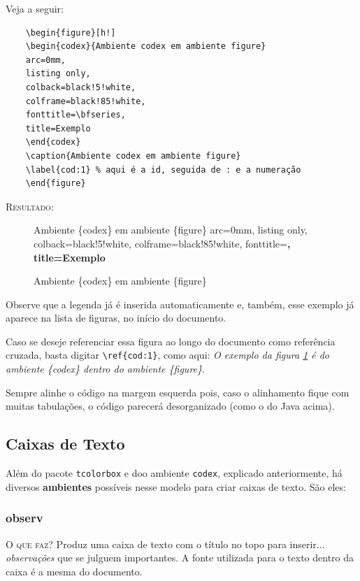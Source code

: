 \documentclass[a4paper,12pt,oneside,openright,extrafontsizes,openbib]{memoir}
\begin{document}
{Veja a seguir:

\begin{verbatim}
	\begin{figure}[h!]
	\begin{codex}{Ambiente codex em ambiente figure}
	arc=0mm,
	listing only,
	colback=black!5!white,
	colframe=black!85!white,
	fonttitle=\bfseries,
	title=Exemplo
	\end{codex}
	\caption{Ambiente codex em ambiente figure}
	\label{cod:1} % aqui é a id, seguida de : e a numeração
	\end{figure}
\end{verbatim}

\textsc{Resultado:}

\begin{figure}[h!]
\begin{codex}{Ambiente \{codex\} em ambiente \{figure\}}
arc=0mm,
listing only,
colback=black!5!white,
colframe=black!85!white,
fonttitle=\bfseries,
title=Exemplo
\end{codex}
\caption{Ambiente \{codex\} em ambiente \{figure\}}
\label{cod:1}
\end{figure}

Observe que a legenda já é inserida automaticamente e, também, esse exemplo já aparece na lista de figuras, no início do documento.

Caso se deseje referenciar essa figura ao longo do documento como referência cruzada, basta digitar \verb|\ref{cod:1}|, como aqui: \textit{O exemplo da figura \ref{cod:1} é do ambiente \{codex\} dentro do ambiente \{figure\}}.


Sempre alinhe o código na margem esquerda pois, caso o alinhamento fique com muitas tabulações, o código parecerá desorganizado (como o do Java acima).

\subsection{Caixas de Texto}

Além do pacote \verb|tcolorbox| e doo ambiente \verb|codex|, explicado anteriormente, há diversos \textbf{ambientes} possíveis nesse modelo para criar caixas de texto. São eles:

\subsubsection{observ}

\textsc{O que faz?} Produz uma caixa de texto com o título  no topo para inserir... \textit{observações} que se julguem importantes. A fonte utilizada para o texto dentro da caixa é a mesma do documento.

}
\end{document}
